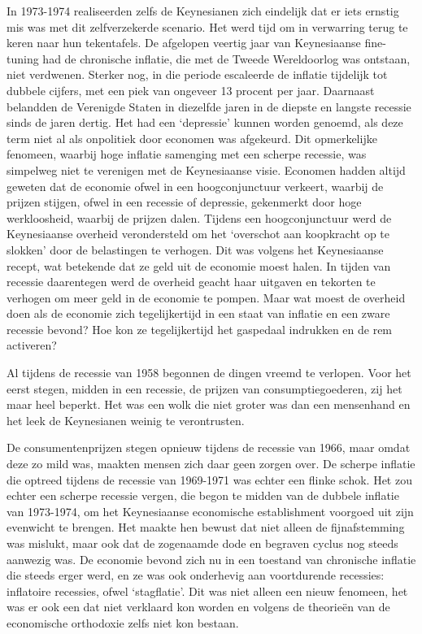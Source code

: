 \documentclass[
  a5paper,
  smalldemyvopaper,10pt,twoside,onecolumn,openright,extrafontsizes,hidelinks]{memoir}
\begin{document}
In 1973-1974 realiseerden zelfs de Keynesianen zich eindelijk dat er
iets ernstig mis was met dit zelfverzekerde scenario. Het werd tijd om
in verwarring terug te keren naar hun tekentafels. De afgelopen veertig
jaar van Keynesiaanse fine-tuning had de chronische inflatie, die met de
Tweede Wereldoorlog was ontstaan, niet verdwenen. Sterker nog, in die
periode escaleerde de inflatie tijdelijk tot dubbele cijfers, met een
piek van ongeveer 13 procent per jaar. Daarnaast belandden de Verenigde
Staten in diezelfde jaren in de diepste en langste recessie sinds de
jaren dertig. Het had een `depressie' kunnen worden genoemd, als deze
term niet al als onpolitiek door economen was afgekeurd. Dit
opmerkelijke fenomeen, waarbij hoge inflatie samenging met een scherpe
recessie, was simpelweg niet te verenigen met de Keynesiaanse visie.
Economen hadden altijd geweten dat de economie ofwel in een
hoogconjunctuur verkeert, waarbij de prijzen stijgen, ofwel in een
recessie of depressie, gekenmerkt door hoge werkloosheid, waarbij de
prijzen dalen. Tijdens een hoogconjunctuur werd de Keynesiaanse overheid
verondersteld om het `overschot aan koopkracht op te slokken' door de
belastingen te verhogen. Dit was volgens het Keynesiaanse recept, wat
betekende dat ze geld uit de economie moest halen. In tijden van
recessie daarentegen werd de overheid geacht haar uitgaven en tekorten
te verhogen om meer geld in de economie te pompen. Maar wat moest de
overheid doen als de economie zich tegelijkertijd in een staat van
inflatie en een zware recessie bevond? Hoe kon ze tegelijkertijd het
gaspedaal indrukken en de rem activeren?

Al tijdens de recessie van 1958 begonnen de dingen vreemd te verlopen.
Voor het eerst stegen, midden in een recessie, de prijzen van
consumptiegoederen, zij het maar heel beperkt. Het was een wolk die niet
groter was dan een mensenhand en het leek de Keynesianen weinig te
verontrusten.

De consumentenprijzen stegen opnieuw tijdens de recessie van 1966, maar
omdat deze zo mild was, maakten mensen zich daar geen zorgen over. De
scherpe inflatie die optreed tijdens de recessie van 1969-1971 was
echter een flinke schok. Het zou echter een scherpe recessie vergen, die
begon te midden van de dubbele inflatie van 1973-1974, om het
Keynesiaanse economische establishment voorgoed uit zijn evenwicht te
brengen. Het maakte hen bewust dat niet alleen de fijnafstemming was
mislukt, maar ook dat de zogenaamde dode en begraven cyclus nog steeds
aanwezig was. De economie bevond zich nu in een toestand van chronische
inflatie die steeds erger werd, en ze was ook onderhevig aan
voortdurende recessies: inflatoire recessies, ofwel `stagflatie'. Dit
was niet alleen een nieuw fenomeen, het was er ook een dat niet
verklaard kon worden en volgens de theorieën van de economische
orthodoxie zelfs niet kon bestaan.
\end{document}
